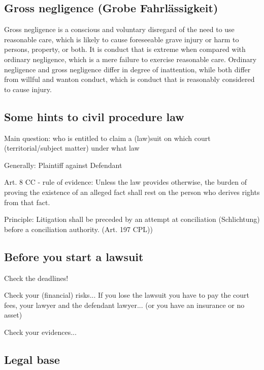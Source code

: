 \subsection{Gross negligence (Grobe Fahrlässigkeit)}
Gross negligence is a conscious and voluntary disregard of the need to use reasonable care, which is likely to cause foreseeable grave injury or harm to persons, property, or both. It is conduct that is extreme when compared with ordinary negligence, which is a mere failure to exercise reasonable care. Ordinary negligence and gross negligence differ in degree of inattention, while both differ from willful and wanton conduct, which is conduct that is reasonably considered to cause injury.

\subsection{Some hints to civil procedure law}
\begin{compactitem}
	\item Main question: who is entitled to claim a (law)suit on which court (territorial/subject matter) under what law
	\item Generally: Plaintiff against Defendant
	\item Art. 8 CC - rule of evidence: Unless the law provides	otherwise, the burden of proving the existence of an alleged fact shall rest on the person who derives rights from that fact.
	\item Principle: Litigation shall be preceded by an attempt at conciliation (Schlichtung) before a conciliation authority. (Art. 197 CPL))
\end{compactitem}

\subsection{Before you start a lawsuit}
\begin{compactitem}
	\item Check the deadlines!
	\item Check your (financial) risks... If you lose the lawsuit you have to pay the court fees, your lawyer and the defendant lawyer... (or you have an insurance or no asset)
	\item Check your evidences...
\end{compactitem}

\subsection{Legal base}
